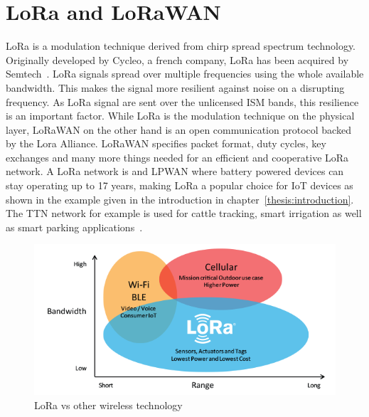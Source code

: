 \chapter{LoRa and LoRaWAN}
\label{chap:lora_and_lorawan}
LoRa is a modulation technique derived from chirp
spread spectrum technology\cite{what_is_lora}. 
Originally developed by Cycleo, a french company, LoRa has been acquired by Semtech~\cite{limits_lora}.
LoRa signals spread over multiple frequencies using the whole available bandwidth.
This makes the signal more resilient against noise on a disrupting frequency. As LoRa
signal are sent over the unlicensed ISM bands, this resilience is an important factor.
While LoRa is the modulation technique on the physical layer, LoRaWAN on the other hand 
is an open communication protocol backed by the Lora Alliance. LoRaWAN specifies packet format,
duty cycles, key exchanges and many more things needed for an efficient and cooperative LoRa network.
A LoRa network is and LPWAN where battery powered devices can stay operating up to 17 years, making LoRa
a popular choice for IoT devices as shown in the example given in the introduction in chapter~\ref{thesis:introduction}. 
The TTN network for example is used for cattle tracking, smart irrigation as well as smart parking applications~\cite{ttn}.

\begin{figure}[h]
    \centering
    \includegraphics[width=1\textwidth]{figures/LoRa_context.png}
    \caption{LoRa vs other wireless technology\cite{lora_context}}
    \label{fig:lora_context}
\end{figure}

